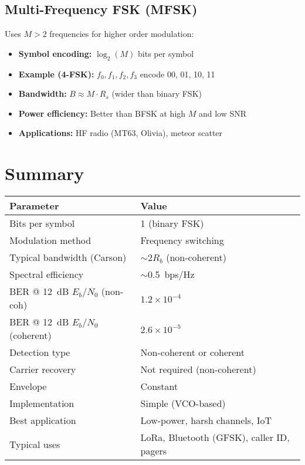 \subsection{Multi-Frequency FSK (MFSK)}

Uses $M > 2$ frequencies for higher order modulation:

\begin{itemize}
\item \textbf{Symbol encoding:} $\log_2(M)$ bits per symbol
\item \textbf{Example (4-FSK):} $f_0, f_1, f_2, f_3$ encode 00, 01, 10, 11
\item \textbf{Bandwidth:} $B \approx M \cdot R_s$ (wider than binary FSK)
\item \textbf{Power efficiency:} Better than BFSK at high $M$ and low SNR
\item \textbf{Applications:} HF radio (MT63, Olivia), meteor scatter
\end{itemize}

\section{Summary}

\begin{center}
\begin{tabular}{@{}ll@{}}
\toprule
\textbf{Parameter} & \textbf{Value} \\
\midrule
Bits per symbol & 1 (binary FSK) \\
Modulation method & Frequency switching \\
Typical bandwidth (Carson) & $\sim$2$R_b$ (non-coherent) \\
Spectral efficiency & $\sim$0.5~bps/Hz \\
BER @ 12~dB $E_b/N_0$ (non-coh) & $1.2 \times 10^{-4}$ \\
BER @ 12~dB $E_b/N_0$ (coherent) & $2.6 \times 10^{-5}$ \\
Detection type & Non-coherent or coherent \\
Carrier recovery & Not required (non-coherent) \\
Envelope & Constant \\
Implementation & Simple (VCO-based) \\
Best application & Low-power, harsh channels, IoT \\
Typical uses & LoRa, Bluetooth (GFSK), caller ID, pagers \\
\bottomrule
\end{tabular}
\end{center}


